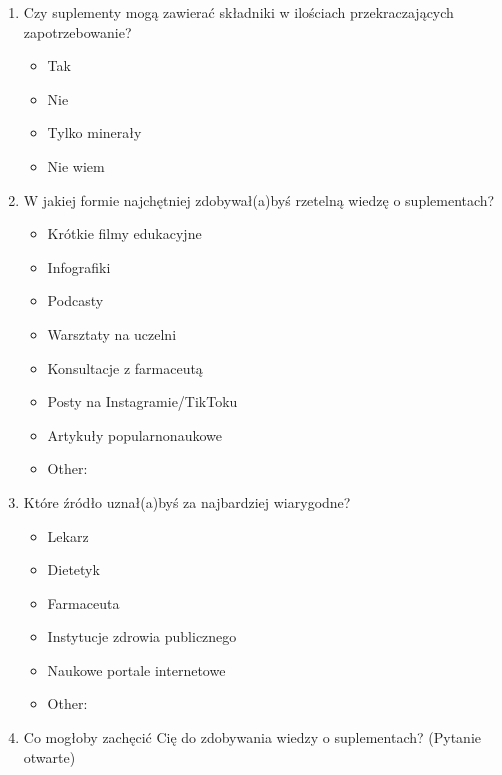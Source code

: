 \documentclass[a4paper, 12pt, oneside]{article}
\begin{document}
\begin{enumerate}
    \item Czy suplementy mogą zawierać składniki w ilościach przekraczających zapotrzebowanie?
    \begin{itemize}
        \item Tak
        \item Nie
        \item Tylko minerały
        \item Nie wiem
    \end{itemize}

    \item W jakiej formie najchętniej zdobywał(a)byś rzetelną wiedzę o suplementach?
    \begin{itemize}
        \item Krótkie filmy edukacyjne
        \item Infografiki
        \item Podcasty
        \item Warsztaty na uczelni
        \item Konsultacje z farmaceutą
        \item Posty na Instagramie/TikToku
        \item Artykuły popularnonaukowe
        \item Other:
    \end{itemize}

    \item Które źródło uznał(a)byś za najbardziej wiarygodne?
    \begin{itemize}
        \item Lekarz
        \item Dietetyk
        \item Farmaceuta
        \item Instytucje zdrowia publicznego
        \item Naukowe portale internetowe
        \item Other:
    \end{itemize}

    \item Co mogłoby zachęcić Cię do zdobywania wiedzy o suplementach? (Pytanie otwarte)

\end{enumerate}
\end{document}
